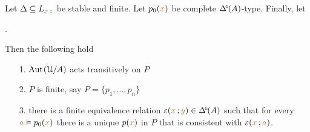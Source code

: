 \begin{theorem}\label{thm_FER}
  Let $\Delta\subseteq L_{{\color{brown} x}\,{\color{green} z}}$ be stable and finite.
  Let $p_0({\color{brown} x})$ be complete $\GDelta(A)$-type.
  Finally, let 
  
  .
  
  Then the following hold
  \begin{itemize}
    \item [1.] ${\rm Aut\kern.15ex}(\EuScript U/A)$ acts transitively on $P$
    \item [2.] $P$ is finite, say $P=\{p_1,\dots,p_n\}$
    
    \item [3.] there is a finite equivalence relation $\epsilon({\mr x}\,;{\mr y})\in\GDelta(A)$ such that for every ${\color{brown} a}\vDash p_0({\color{brown} x})$ there is a unique $p({\color{brown} x})$ in $P$ that is consistent with $\varepsilon({\color{brown} x}\,;{\color{brown} a})$.
  \end{itemize}
\end{theorem}

